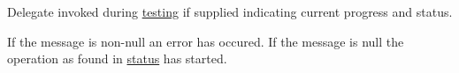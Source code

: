 Delegate invoked during \hyperlink{class_i_c_sharp_code_1_1_sharp_zip_lib_1_1_zip_1_1_zip_file_a8afce1b1400373bb6e6f88021ef80441}{testing} if supplied indicating current progress and status. 

If the message is non-\/null an error has occured. If the message is null the operation as found in \hyperlink{class_i_c_sharp_code_1_1_sharp_zip_lib_1_1_zip_1_1_test_status}{status} has started.